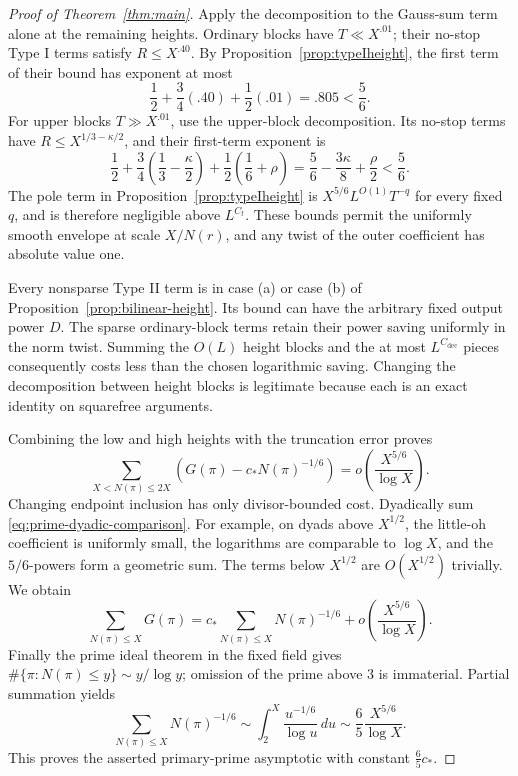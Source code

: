 \begin{proof}[Proof of Theorem~\ref{thm:main}]
Apply the decomposition to the Gauss-sum term alone at the remaining
heights. Ordinary blocks have \(T\ll X^{.01}\); their no-stop
Type I terms satisfy \(R\le X^{.40}\). By
Proposition~\ref{prop:typeIheight}, the first term of their bound
has exponent at most
\[
 \frac12+\frac34(.40)+\frac12(.01)=.805<\frac56.
\]
For upper blocks \(T\gg X^{.01}\), use the upper-block
decomposition. Its no-stop terms have
\(R\le X^{1/3-\kappa/2}\), and their first-term exponent is
\[
 \frac12+\frac34\left(\frac13-\frac\kappa2\right)
       +\frac12\left(\frac16+\rho\right)
   =\frac56-\frac{3\kappa}{8}+\frac\rho2<\frac56.
\]
The pole term in Proposition~\ref{prop:typeIheight} is
\(X^{5/6}L^{O(1)}T^{-q}\) for every fixed \(q\), and is
therefore negligible above \(L^{C_t}\). These bounds permit the
uniformly smooth envelope at scale \(X/N(r)\), and any twist of
the outer coefficient has absolute value one.

Every nonsparse Type II term is in case (a) or case (b) of
Proposition~\ref{prop:bilinear-height}. Its bound can have the
arbitrary fixed output power \(D\). The sparse ordinary-block terms retain their
power saving uniformly in the norm twist. Summing the
\(O(L)\) height blocks and the at most
\(L^{C_{\mathrm{dec}}}\) pieces consequently costs less than
the chosen logarithmic saving. Changing the decomposition between
height blocks is legitimate because each is an exact identity on
squarefree arguments.

Combining the low and high heights with the truncation error proves
\begin{equation}
 \sum_{X<N(\pi)\le2X}
       \left(G(\pi)-c_*N(\pi)^{-1/6}\right)
       =o\!\left(\frac{X^{5/6}}{\log X}\right).
 \label{eq:prime-dyadic-comparison}
\end{equation}
Changing endpoint inclusion has only divisor-bounded cost.
Dyadically sum \eqref{eq:prime-dyadic-comparison}. For example,
on dyads above \(X^{1/2}\), the little-oh coefficient is uniformly
small, the logarithms are comparable to \(\log X\), and the
\(5/6\)-powers form a geometric sum. The terms below \(X^{1/2}\)
are \(O(X^{1/2})\) trivially. We obtain
\[
 \sum_{N(\pi)\le X}G(\pi)
   =c_*\sum_{N(\pi)\le X}N(\pi)^{-1/6}
       +o\!\left(\frac{X^{5/6}}{\log X}\right).
\]
Finally the prime ideal theorem in the fixed field gives
\(\#\{\pi:N(\pi)\le y\}\sim y/\log y\); omission of the
prime above \(3\) is immaterial. Partial summation yields
\[
 \sum_{N(\pi)\le X}N(\pi)^{-1/6}
   \sim\int_2^X\frac{u^{-1/6}}{\log u}\,du
   \sim\frac65\frac{X^{5/6}}{\log X}.
\]
This proves the asserted primary-prime asymptotic with constant
\(\frac65c_*\).
\end{proof}
